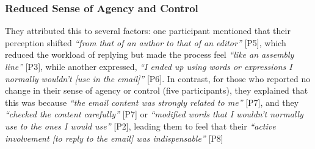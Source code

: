 \subsubsection{Reduced Sense of Agency and Control}
\label{sec:result2_agency_control}
They attributed this to several factors: one participant mentioned that their perception shifted \textit{``from that of an author to that of an editor''} [P5], which reduced the workload of replying but made the process feel \textit{``like an assembly line''} [P3], while another expressed, \textit{``I ended up using words or expressions I normally wouldn't [use in the email]''} [P6].
In contrast, for those who reported no change in their sense of agency or control (five participants), they explained that this was because  \textit{``the email content was strongly related to me''} [P7], and they \textit{``checked the content carefully''} [P7] or \textit{``modified words that I wouldn't normally use to the ones I would use''} [P2], leading them to feel that their \textit{``active involvement [to reply to the email] was indispensable''} [P8]

